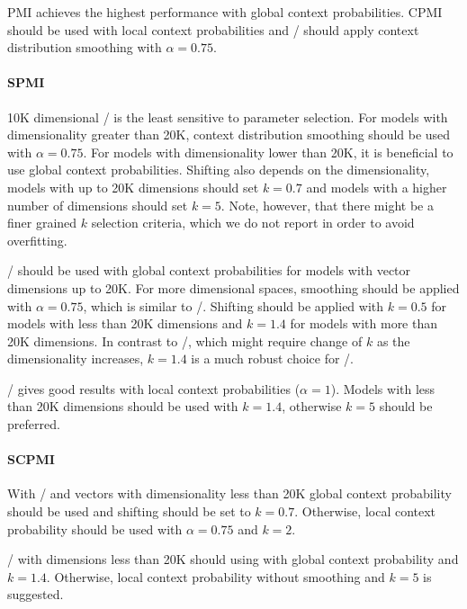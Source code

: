 \documentclass[11pt]{article}
\begin{document}
PMI achieves the highest performance with global context probabilities. CPMI should be used with local context probabilities and \CPMI/ should apply context distribution smoothing with $\alpha = 0.75$.

\paragraph{SPMI}

10K dimensional \SPMI/ is the least sensitive to parameter selection. For models with dimensionality greater than 20K, context distribution smoothing should be used with $\alpha = 0.75$. For models with dimensionality lower than 20K, it is beneficial to use global context probabilities. Shifting also depends on the dimensionality, models with up to 20K dimensions should set $k = 0.7$ and models with a higher number of dimensions should set $k = 5$. Note, however, that there might be a finer grained $k$ selection criteria, which we do not report in order to avoid overfitting.



\logNSPMI/ should be used with global context probabilities for models with vector dimensions up to 20K. For more dimensional spaces, smoothing should be applied with $\alpha = 0.75$, which is similar to \SPMI/. Shifting should be applied with $k = 0.5$ for models with less than 20K dimensions and $k = 1.4$ for models with more than 20K dimensions. In contrast to \SPMI/, which might require change of $k$ as the dimensionality increases, $k = 1.4$ is a much robust choice for \logNSPMI/.

\NSPMI/ gives good results with local context probabilities ($\alpha = 1$). Models with less than 20K dimensions should be used with $k = 1.4$, otherwise $k = 5$ should be preferred.

\paragraph{SCPMI}

With \SCPMI/ and vectors with dimensionality less than 20K global context probability should be used and shifting should be set to $k = 0.7$. Otherwise, local context probability should be used with $\alpha = 0.75$ and $k = 2$.

\NSCPMI/ with dimensions less than 20K should using with global context probability and $k = 1.4$. Otherwise, local context probability without smoothing and $k = 5$ is suggested.
\end{document}

